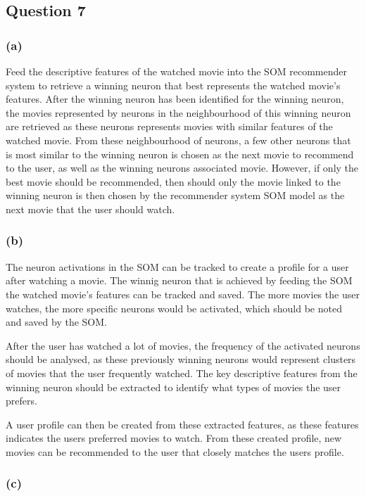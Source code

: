 \documentclass[10pt]{article}
\begin{document}
\subsection*{Question 7}

\subsubsection*{(a)}

Feed the descriptive features of the watched movie into the SOM recommender system to retrieve
a winning neuron that best represents the watched movie's features. After the winning neuron
has been identified for the winning neuron, the movies represented by neurons in the neighbourhood
of this winning neuron are retrieved as these neurons represents movies with similar
features of the watched movie. From these neighbourhood of neurons, a few other neurons
that is most similar to the winning neuron is chosen as the next movie to recommend to the user, as
well as the winning neurons associated movie. However, if only the best movie should be recommended,
then should only the movie linked to the winning
neuron is then chosen by the recommender system SOM model as the next movie that the user should watch.

\subsubsection*{(b)}

The neuron activations in the SOM can be tracked to create a profile for a user after watching a movie.
The winnig neuron that is achieved by feeding the SOM the watched movie's features can be tracked and
saved. The more movies the user watches, the more specific neurons would be activated, which should
be noted and saved by the SOM.

After the user has watched a lot of movies, the frequency of the activated neurons should be analysed,
as these previously winning neurons would represent clusters of movies that the user frequently watched.
The key descriptive features from the winning neuron should be extracted to identify what types of movies
the user prefers.

A user profile can then be created from these extracted features, as these features indicates the
users preferred movies to watch. From these created profile, new movies can be recommended to the
user that closely matches the users profile.

\subsubsection*{(c)}
\end{document}
